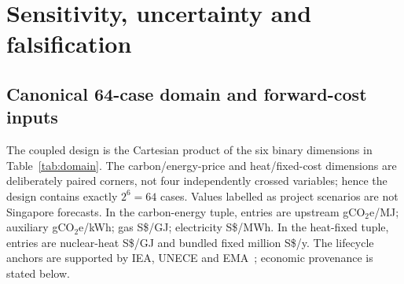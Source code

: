 \section{Sensitivity, uncertainty and falsification}

\subsection{Canonical 64-case domain and forward-cost inputs}
The coupled design is the Cartesian product of the six binary dimensions in Table~\ref{tab:domain}. The carbon/energy-price and heat/fixed-cost dimensions are deliberately paired corners, not four independently crossed variables; hence the design contains exactly $2^6=64$ cases. Values labelled as project scenarios are not Singapore forecasts. In the carbon-energy tuple, entries are upstream gCO$_2$e/MJ; auxiliary gCO$_2$e/kWh; gas S\$/GJ; electricity S\$/MWh. In the heat-fixed tuple, entries are nuclear-heat S\$/GJ and bundled fixed million S\$/y. The lifecycle anchors are supported by IEA, UNECE and EMA~\cite{iea2026lng,unece2022lca,emagrid2024}; economic provenance is stated below.

\begin{table}[htbp]
\centering
\caption{Canonical binary dimensions defining the 64-case Gate-5 design. Semicolon-separated entries within a paired corner move together.}
\label{tab:domain}
\scriptsize
{}
\end{table}

